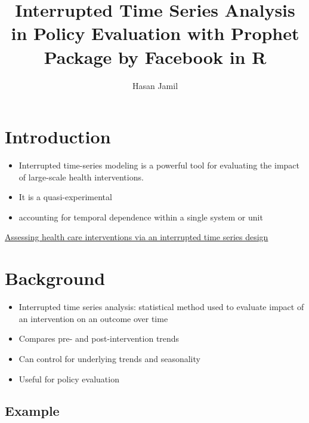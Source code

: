 \documentclass[
  letterpaper,
  DIV=11,
  numbers=noendperiod]{scrartcl}
\title{Interrupted Time Series Analysis in Policy Evaluation with
Prophet Package by Facebook in R}
\author{Hasan Jamil}
\date{}
\providecommand{\tightlist}{%
  \setlength{\itemsep}{0pt}\setlength{\parskip}{0pt}}\usepackage{longtable,booktabs,array}
\begin{document}
\maketitle
\ifdefined\Shaded\renewenvironment{Shaded}{\begin{tcolorbox}[interior hidden, breakable, enhanced, boxrule=0pt, borderline west={3pt}{0pt}{shadecolor}, sharp corners, frame hidden]}{\end{tcolorbox}}\fi

\hypertarget{introduction}{%
\section{Introduction}\label{introduction}}

\begin{itemize}
\tightlist
\item
  Interrupted time-series modeling is a powerful tool for evaluating the
  impact of large-scale health interventions.
\item
  It is a quasi-experimental
\item
  accounting for temporal dependence within a single system or unit
\end{itemize}

\href{https://pubmed.ncbi.nlm.nih.gov/30616298/}{Assessing health care
interventions via an interrupted time series design}

\hypertarget{background}{%
\section{Background}\label{background}}

\begin{itemize}
\tightlist
\item
  Interrupted time series analysis: statistical method used to evaluate
  impact of an intervention on an outcome over time
\item
  Compares pre- and post-intervention trends
\item
  Can control for underlying trends and seasonality
\item
  Useful for policy evaluation
\end{itemize}

\hypertarget{example}{%
\subsection{Example}\label{example}}
\end{document}
